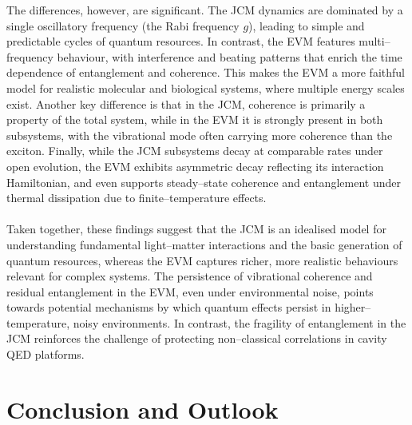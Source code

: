 \documentclass[11pt]{article}
\begin{document}
The differences, however, are significant. The JCM dynamics are dominated by a single oscillatory frequency (the Rabi frequency $g$), leading to simple and predictable cycles of quantum resources. In contrast, the EVM features multi--frequency behaviour, with interference and beating patterns that enrich the time dependence of entanglement and coherence. This makes the EVM a more faithful model for realistic molecular and biological systems, where multiple energy scales exist. Another key difference is that in the JCM, coherence is primarily a property of the total system, while in the EVM it is strongly present in both subsystems, with the vibrational mode often carrying more coherence than the exciton. Finally, while the JCM subsystems decay at comparable rates under open evolution, the EVM exhibits asymmetric decay reflecting its interaction Hamiltonian, and even supports steady--state coherence and entanglement under thermal dissipation due to finite--temperature effects.\\
\\
Taken together, these findings suggest that the JCM is an idealised model for understanding fundamental light--matter interactions and the basic generation of quantum resources, whereas the EVM captures richer, more realistic behaviours relevant for complex systems. The persistence of vibrational coherence and residual entanglement in the EVM, even under environmental noise, points towards potential mechanisms by which quantum effects persist in higher--temperature, noisy environments. In contrast, the fragility of entanglement in the JCM reinforces the challenge of protecting non--classical correlations in cavity QED platforms.

\newpage
\section{Conclusion and Outlook} \label{sec:conc}

\newpage
{}
 
 
\end{document}

